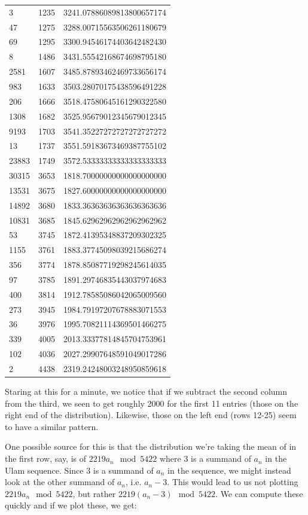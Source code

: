 \documentclass{report}
\theoremstyle{remark}
\numberwithin{equation}{section}
\begin{document}
\begin{tabular}{lll}
3	&1235	&3241.07886089813800657174\\
47	&1275	&3288.00715563506261180679\\
69	&1295	&3300.94546174403642482430\\
8	&1486	&3431.55542168674698795180\\
2581	&1607	&3485.87893462469733656174\\
983	&1633	&3503.28070175438596491228\\
206	&1666	&3518.47580645161290322580\\
1308	&1682	&3525.95679012345679012345\\
9193	&1703	&3541.35227272727272727272\\
13	&1737	&3551.59183673469387755102\\
23883	&1749	&3572.53333333333333333333\\
30315	&3653	&1818.70000000000000000000\\
13531	&3675	&1827.60000000000000000000\\
14892	&3680	&1833.36363636363636363636\\
10831	&3685	&1845.62962962962962962962\\
53	&3745	&1872.41395348837209302325\\
1155	&3761	&1883.37745098039215686274\\
356	&3774	&1878.85087719298245614035\\
97	&3785	&1891.29746835443037974683\\
400	&3814	&1912.78585086042065009560\\
273	&3945	&1984.79197207678883071553\\
36	&3976	&1995.70821114369501466275\\
339	&4005	&2013.33377814845704753961\\
102	&4036	&2027.29907648591049017286\\
2	&4438	&2319.24248003248950859618
\end{tabular}

Staring at this for a minute, we notice that if we subtract the second
column from the third, we seen to get roughly 2000 for the first 11
entries (those on the right end of the distribution).  Likewise, those
on the left end (rows 12-25) seem to have a similar pattern.

One possible source for this is that the distribution we're taking the
mean of in the first row, say, is of $2219 a_n \mod{5422}$ where 3 is
a summand of $a_n$ in the Ulam sequence.  Since 3 is a summand of
$a_n$ in the sequence, we might instead look at the other summand of
$a_n$, i.e. $a_n - 3$.  This would lead to us not plotting
$2219a_n \mod {5422}$, but rather $2219(a_n-3) \mod{5422}$.  We can
compute these quickly and if we plot these, we get: 
\end{document}
